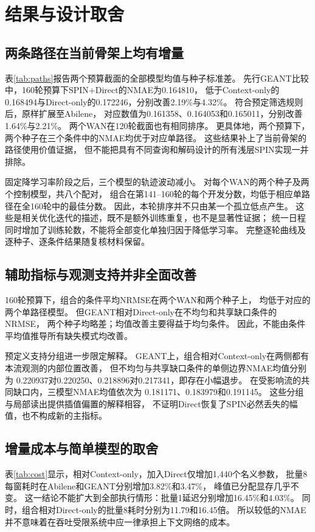 \section{结果与设计取舍}
\label{sec:results}

\subsection{两条路径在当前骨架上均有增量}
表\ref{tab:paths}报告两个预算截面的全部模型均值与种子标准差。
先行GEANT比较中，160轮预算下SPIN+Direct的NMAE为0.164810，
低于Context-only的0.168494与Direct-only的0.172246，分别改善2.19\%与4.32\%。
符合预定筛选规则后，原样扩展至Abilene，
对应数值为0.161358、0.164053和0.165011，分别改善1.64\%与2.21\%。
两个WAN在120轮截面也有相同排序。
更具体地，两个预算下，两个种子在三个条件中的NMAE均优于对应单路径。
这些结果补上了当前骨架的路径使用价值证据，
但不能把具有不同查询和解码设计的所有浅层SPIN实现一并排除。

固定降学习率阶段之后，三个模型的轨迹波动减小。
对每个WAN的两个种子及两个控制模型，共八个配对，
组合在第141--160轮的每个开发分数，均低于相应单路径在全160轮中的最佳分数。
因此，本轮排序并不只由某一个孤立低点产生。
这些是相关优化迭代的描述，既不是额外训练重复，也不是显著性证据；
统一日程同时增加了训练轮数，不能将全部变化单独归因于降低学习率。
完整逐轮曲线及逐种子、逐条件结果随复核材料保留。

\subsection{辅助指标与观测支持并非全面改善}
160轮预算下，组合的条件平均NRMSE在两个WAN和两个种子上，
均低于对应的两个单路径模型。
但GEANT相对Direct-only在不均匀和共享缺口条件的NRMSE，
两个种子均略差；均值改善主要得益于均匀条件。
因此，不能由条件平均值推导所有缺失模式均改善。

预定义支持分组进一步限定解释。
GEANT上，组合相对Context-only在两侧都有本流观测的内部位置改善，
但不均匀与共享缺口条件的单侧边界NMAE均值分别为
0.220937对0.220250、0.218896对0.217341，即存在小幅退步。
在受影响流的共同缺口内，三模型NMAE均值依次为
0.181171、0.183979和0.191145。
这些分组与局部读出提供插值偏置的解释相容，
不证明Direct恢复了SPIN必然丢失的幅值，也不构成新的主指标。

\subsection{增量成本与简单模型的取舍}
表\ref{tab:cost}显示，相对Context-only，加入Direct仅增加1,440个名义参数，
批量8每窗耗时在Abilene和GEANT分别增加3.82\%和3.47\%，
峰值已分配显存几乎不变。
这一结论不能扩大到全部执行情形：批量1延迟分别增加16.45\%和4.03\%。
同时，组合相对Direct-only的批量8耗时分别为11.79和16.45倍。
所以较低的NMAE并不意味着在吞吐受限系统中应一律承担上下文网络的成本。

